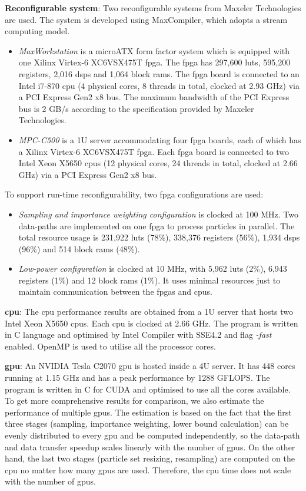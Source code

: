 \textbf{Reconfigurable system}: Two reconfigurable systems from Maxeler Technologies are used.
The system is developed using MaxCompiler, which adopts a stream computing model.
\begin{itemize}
\item \textit{MaxWorkstation} is a microATX form factor system which is equipped with one Xilinx Virtex-6 XC6VSX475T \gls{fpga}.
The \gls{fpga} has 297,600 \glspl{lut}, 595,200 registers, 2,016 \glspl{dsp} and 1,064 block \glspl{ram}. 
The \gls{fpga} board is connected to an Intel i7-870 \gls{cpu} (4 physical cores, 8 threads in total, clocked at 2.93 GHz) via a PCI Express Gen2 x8 bus.
The maximum bandwidth of the PCI Express bus is 2 GB/s according to the specification provided by Maxeler Technologies.
\item \textit{MPC-C500} is a 1U server accommodating four \gls{fpga} boards, each of which has a Xilinx Virtex-6 XC6VSX475T \gls{fpga}.
Each \gls{fpga} board is connected to two Intel Xeon X5650 \glspl{cpu} (12 physical cores, 24 threads in total, clocked at 2.66 GHz) via a PCI Express Gen2 x8 bus.
\end{itemize}

To support run-time reconfigurability, two \gls{fpga} configurations are used:
\begin{itemize}
\item {\it Sampling and importance weighting configuration} is clocked at 100 MHz.
Two data-paths are implemented on one \gls{fpga} to process particles in parallel.
The total resource usage is 231,922 \glspl{lut} (78\%), 338,376 registers (56\%), 1,934 \glspl{dsp} (96\%) and 514 block \glspl{ram} (48\%).
\item {\it Low-power configuration} is clocked at 10 MHz, with 5,962 \glspl{lut} (2\%), 6,943 registers (1\%) and 12 block \glspl{ram} (1\%).
It uses minimal resources just to maintain communication between the \glspl{fpga} and \glspl{cpu}.
\end{itemize}

\textbf{\gls{cpu}}: The \gls{cpu} performance results are obtained from a 1U server that hosts two Intel Xeon X5650 \glspl{cpu}. 
Each \gls{cpu} is clocked at 2.66 GHz.
The program is written in C language and optimised by Intel Compiler with SSE4.2 and flag {\it -fast} enabled.
OpenMP is used to utilise all the processor cores.

\textbf{\gls{gpu}}: An NVIDIA Tesla C2070 \gls{gpu} is hosted inside a 4U server.
It has 448 cores running at 1.15 GHz and has a peak performance by 1288 GFLOPS.
The program is written in C for CUDA and optimised to use all the cores available.
To get more comprehensive results for comparison, we also estimate the performance of multiple \glspl{gpu}.
The estimation is based on the fact that the first three stages (sampling, importance weighting, lower bound calculation) can be evenly distributed to every \gls{gpu} and be computed independently, 
so the data-path and data transfer speedup scales linearly with the number of \glspl{gpu}.
On the other hand, the last two stages (particle set resizing, resampling) are computed on the \gls{cpu} no matter how many \glspl{gpu} are used.
Therefore, the \gls{cpu} time does not scale with the number of \glspl{gpu}.

